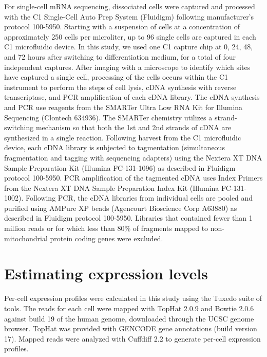 \documentclass[10pt,oneside]{article}\usepackage[]{graphicx}\usepackage[]{color}
\begin{document}
For single-cell mRNA sequencing, dissociated cells were captured and processed with the C1 Single-Cell Auto Prep System (Fluidigm) following manufacturer's protocol 100-5950.  
Starting with a suspension of cells at a concentration of approximately 250 cells per microliter, up to 96 single cells are captured in each C1 microfluidic device. 
In this study, we used one C1 capture chip at 0, 24, 48, and 72 hours after switching to differentiation medium, for a total of four independent captures. 
After imaging with a microscope to identify which sites have captured a single cell, processing of the cells occurs within the C1 instrument to perform the steps of cell lysis, cDNA synthesis with reverse transcriptase, and PCR amplification of each cDNA library.  
The cDNA synthesis and PCR use reagents from the SMARTer Ultra Low RNA Kit for Illumina Sequencing (Clontech 634936).  
The SMARTer chemistry utilizes a strand-switching mechanism so that both the 1st and 2nd strands of cDNA are synthesized in a single reaction.  Following harvest from the C1 microfluidic device, each cDNA library is subjected to tagmentation (simultaneous fragmentation and tagging with sequencing adapters) using the Nextera XT DNA Sample Preparation Kit (Illumina FC-131-1096) as described in Fluidigm protocol 100-5950.  
PCR amplification of the tagmented cDNA uses Index Primers from the Nextera XT DNA Sample Preparation Index Kit (Illumina FC-131-1002).  
Following PCR, the cDNA libraries from individual cells are pooled and purified using AMPure XP beads (Agencourt Bioscience Corp A63880) as described in Fluidigm protocol 100-5950.
Libraries that contained fewer than 1 million reads or for which less than 80\% of fragments mapped to non-mitochondrial protein coding genes were excluded.

\section{Estimating expression levels}
Per-cell expression profiles were calculated in this study using the Tuxedo suite of tools\cite{Trapnell:2012kp}. The reads for each cell were mapped with TopHat\cite{Kim:2013eo} 2.0.9 and Bowtie\cite{Langmead:2012jh} 2.0.6 against build 19 of the human genome, downloaded through the UCSC genome browser. TopHat was provided with GENCODE\cite{Harrow:2006ee} gene annotations (build version 17). Mapped reads were analyzed with Cuffdiff\cite{Trapnell:2012gg} 2.2 to generate per-cell expression profiles. 
\end{document}
